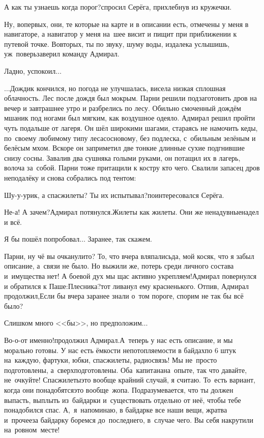 \diagdash А как ты узнаешь когда порог?\mdash спросил Серёга, прихлебнув из кружечки.

\diagdash Ну, во\sdash первых, они, те которые на карте и в описании есть, отмечены у меня в навигаторе, а навигатор у меня на~шее висит и пищит при приближении к путевой точке. Во\sdash вторых, ты по звуку, шуму воды, издалека услышишь, уж~поверь\mdash заверил команду Адмирал.

\diagdash Ладно, успокоил$\ldots$

\vspace{0.5cm}
$\ldots$Дождик кончился, но погода не улучшалась, висела низкая сплошная облачность. Лес после дождя был мокрым. Парни решили подзаготовить дров на вечер и завтрашнее утро и разбрелись по лесу. Обильно смоченный дождём мшаник под ногами был мягким, как воздушное одеяло. Адмирал решил пройти чуть подальше от лагеря. Он шёл широкими шагами, стараясь не намочить кеды, по~своему любимому типу леса\mdash сосновому, без подлеска, с~обильным зелёным и белёсым мхом. Вскоре он заприметил две тонкие длинные сухие подгнившие снизу сосны. Завалив два сушняка голыми руками, он потащил их в лагерь, волоча за~собой. Парни тоже притащили к костру кто чего. Свалили запасец дров неподалёку и снова собрались под тентом:

\diagdash Шу-у-урик, а спасжилеты? Ты их испытывал?\mdash поинтересовался Серёга.

\diagdash Не-а! А зачем?\mdash Адмирал потянулся.\mdash Жилеты как жилеты. Они же ненадувные\mdash надел и всё.

\diagdash Я бы пошёл попробовал$\ldots$ Заранее, так скажем.

\diagdash Парни, ну чё вы очканули\sdash то? То, что вчера вляпались\mdash да, мой косяк, что я забыл описание, а~связи не было. Но выжили же, потерь среди личного состава и~имущества нет! А боевой дух мы щас активно укрепляем!\mdash Адмирал повернулся и обратился к Паше:\mdash Плесни\sdash ка?\mdash тот ливанул ему красненького. Отпив, Адмирал продолжил,\mdash Если бы вчера заранее знали о~том пороге, спорим не так бы всё было?

\diagdash Слишком много <<бы>>, но предположим$\ldots$

\diagdash Во-о-от именно!\mdash продолжил Адмирал.\mdash А~теперь у нас есть описание, и мы морально готовы. У нас есть ёмкости непотопляемости в байдах\mdash по 6 штук на~каждую, фартуки, юбки, спасжилеты, радиосвязь! Мы не~просто подготовлены, а~сверхподготовлены. Оба~капитана\mdash на~опыте, так что давайте, не~очкуйте! Спасжилеты\mdash это вообще крайний случай, я считаю. То~есть вариант, когда они понадобятся\mdash это вообще~жопа. Подразумевается, что ты должен выпасть, выплыть из~байдарки и~существовать отдельно от неё, чтобы тебе понадобился спас. А,~я~напоминаю, в байдарке все наши вещи, жратва и~прочее\mdash за байдарку боремся до~последнего, в~случае чего. Вы себя накрутили на~ровном~месте!

